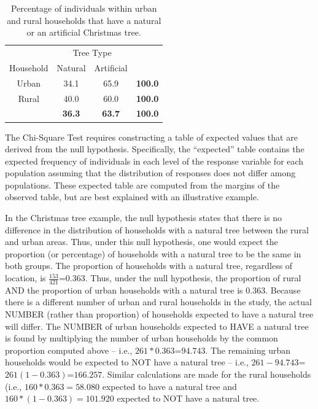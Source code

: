 \documentclass[10pt,openany]{book}\usepackage[]{graphicx}\usepackage[]{color}
\begin{document}
\begin{table}[htbp]
  \centering
  \caption{Percentage of individuals within urban and rural households that have a natural or an artificial Christmas tree.}\label{tab:ChiTreeObsProp}
    \begin{tabular}{c|c|c|c|}
      \multicolumn{1}{c}{} & \multicolumn{2}{c}{Tree Type} & \multicolumn{1}{c}{} \\
      \cline{2-3}
      Household & Natural & Artificial & \multicolumn{1}{c}{} \\
      \hline
      \multicolumn{1}{|c|}{Urban} & 34.1 & 65.9 & \textbf{100.0} \\
      \hline
      \multicolumn{1}{|c|}{Rural} & 40.0 & 60.0 & \textbf{100.0} \\
      \hline
       & \textbf{36.3} & \textbf{63.7} & \textbf{100.0} \\
      \cline{2-4}
    \end{tabular}
\end{table}

The Chi-Square Test requires constructing a table of expected values that are derived from the null hypothesis. Specifically, the ``expected'' table contains the expected frequency of individuals in each level of the response variable for each population assuming that the distribution of responses does not differ among populations. These expected table are computed from the margins of the observed table, but are best explained with an illustrative example.

In the Christmas tree example, the null hypothesis states that there is no difference in the distribution of households with a natural tree between the rural and urban areas. Thus, under this null hypothesis, one would expect the proportion (or percentage) of households with a natural tree to be the same in both groups. The proportion of households with a natural tree, regardless of location, is $\frac{153}{421}$=$0.363$. Thus, under the null hypothesis, the proportion of rural AND the proportion of urban households with a natural tree is $0.363$. Because there is a different number of urban and rural households in the study, the actual NUMBER (rather than proportion) of households expected to have a natural tree will differ. The NUMBER of urban households expected to HAVE a natural tree is found by multiplying the number of urban households by the common proportion computed above -- i.e., $261*0.363$=$94.743$. The remaining urban households would be expected to NOT have a natural tree -- i.e., $261-94.743$=$261(1-0.363)$=$166.257$. Similar calculations are made for the rural households (i.e., $160*0.363=58.080$ expected to have a natural tree and $160*(1-0.363)=101.920$ expected to NOT have a natural tree.
\end{document}
